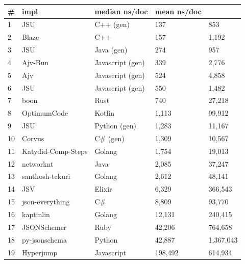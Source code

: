 \begin{tabular}{ll|l|ll}
\# & impl & median ns/doc & mean ns/doc \\
\hline
1 & JSU & C++ (gen) & 137 & 853 \\
2 & Blaze & C++ & 157 & 1,192 \\
3 & JSU & Java (gen) & 274 & 957 \\
4 & Ajv-Bun & Javascript (gen) & 339 & 2,776 \\
5 & Ajv & Javascript (gen) & 524 & 4,858 \\
6 & JSU & Javascript (gen) & 550 & 1,482 \\
7 & boon & Rust & 740 & 27,218 \\
8 & OptimumCode & Kotlin & 1,113 & 99,912 \\
9 & JSU & Python (gen) & 1,283 & 11,167 \\
10 & Corvus & C\# (gen) & 1,309 & 10,567 \\
11 & Katydid-Comp-Steps & Golang & 1,754 & 19,013 \\
12 & networknt & Java & 2,085 & 37,247 \\
13 & santhosh-tekuri & Golang & 2,612 & 48,141 \\
14 & JSV & Elixir & 6,329 & 366,543 \\
15 & json-everything & C\# & 8,809 & 93,770 \\
16 & kaptinlin & Golang & 12,131 & 240,415 \\
17 & JSONSchemer & Ruby & 42,206 & 764,658 \\
18 & py-jsonschema & Python & 42,887 & 1,367,043 \\
19 & Hyperjump & Javascript & 198,492 & 614,934 \\
\end{tabular}
